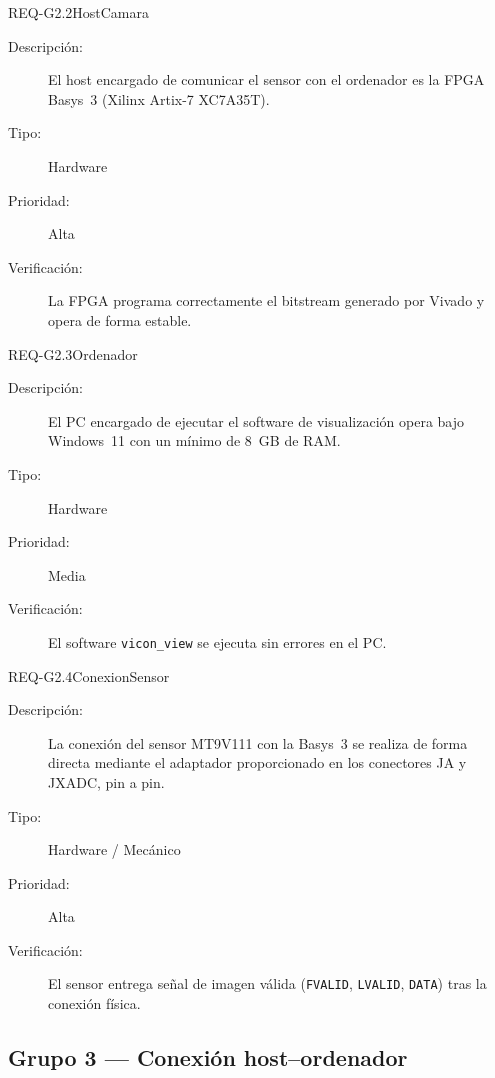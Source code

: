 \documentclass[../main.tex]{subfiles}
\begin{document}
\begin{requisito}{REQ-G2.2}{HostCamara}
\begin{description}
    \item[Descripción:]   El host encargado de comunicar el sensor con el ordenador es la FPGA Basys~3 (Xilinx Artix-7 XC7A35T).
    \item[Tipo:]          Hardware
    \item[Prioridad:]     Alta
    \item[Verificación:]  La FPGA programa correctamente el bitstream generado por Vivado y opera de forma estable.
\end{description}
\end{requisito}

\begin{requisito}{REQ-G2.3}{Ordenador}
\begin{description}
    \item[Descripción:]   El PC encargado de ejecutar el software de visualización opera bajo Windows~11 con un mínimo de 8~GB de RAM.
    \item[Tipo:]          Hardware
    \item[Prioridad:]     Media
    \item[Verificación:]  El software \texttt{vicon\_view} se ejecuta sin errores en el PC.
\end{description}
\end{requisito}

\begin{requisito}{REQ-G2.4}{ConexionSensor}
\begin{description}
    \item[Descripción:]   La conexión del sensor MT9V111 con la Basys~3 se realiza de forma directa mediante el adaptador proporcionado en los conectores JA y JXADC, pin a pin.
    \item[Tipo:]          Hardware / Mecánico
    \item[Prioridad:]     Alta
    \item[Verificación:]  El sensor entrega señal de imagen válida (\texttt{FVALID}, \texttt{LVALID}, \texttt{DATA}) tras la conexión física.
\end{description}
\end{requisito}

\subsection{Grupo 3 — Conexión host--ordenador}
\end{document}
